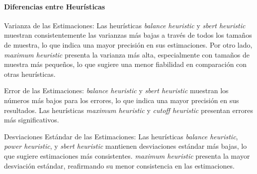 \documentclass{article}
\begin{document}
\begin{table}[H]
\centering
\label{table:heuristic_analysis}
\caption{Análisis de los resultados por heurística}
\end{table}


\paragraph{Diferencias entre Heurísticas}
Varianza de las Estimaciones: Las heurísticas \textit{balance heuristic} y \textit{sbert heuristic} muestran consistentemente las varianzas más bajas a través de todos los tamaños de muestra, lo que indica una mayor precisión en sus estimaciones.
Por otro lado, \textit{maximum heuristic} presenta la varianza más alta, especialmente con tamaños de muestra más pequeños, lo que sugiere una menor fiabilidad en comparación con otras heurísticas.

Error de las Estimaciones: \textit{balance heuristic} y \textit{sbert heuristic} muestran los números más bajos para los errores, lo que indica una mayor precisión en sus resultados.
Las heurísticas \textit{maximum heuristic} y \textit{cutoff heuristic} presentan errores más significativos.

Desviaciones Estándar de las Estimaciones: Las heurísticas \textit{balance heuristic}, \textit{power heuristic}, y \textit{sbert heuristic} mantienen desviaciones estándar más bajas, lo que sugiere estimaciones más consistentes.
\textit{maximum heuristic} presenta la mayor desviación estándar, reafirmando su menor consistencia en las estimaciones.
\end{document}
